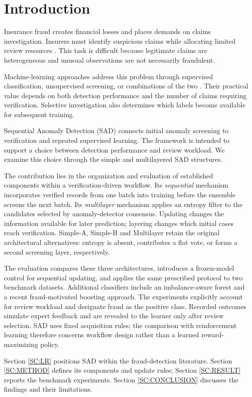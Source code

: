 \section{Introduction}\label{sec:introduction}
Insurance fraud creates financial losses and places demands on claims
investigation. Insurers must identify suspicious claims while allocating
limited review resources \citep{A61,Bolton2002}. This task is difficult
because legitimate claims are heterogeneous and unusual observations are
not necessarily fraudulent.

Machine-learning approaches address this problem through supervised
classification, unsupervised screening, or combinations of the two
\citep{Ngai2011,West2016,Schrijver2024}. Their practical value depends on
both detection performance and the number of claims requiring verification.
Selective investigation also determines which labels become available
for subsequent training.

Sequential Anomaly Detection (SAD) connects initial anomaly screening to
verification and repeated supervised learning. The framework is intended
to support a choice between detection performance and review workload.
We examine this choice through the simple and multilayered SAD structures.

\begin{revised}
The contribution lies in the organization and evaluation of established
components within a verification-driven workflow. Its \emph{sequential}
mechanism incorporates verified records from one batch into training before
the ensemble screens the next batch. Its \emph{multilayer} mechanism
applies an entropy filter to the candidates selected by anomaly-detector
consensus. Updating changes the information available for later prediction;
layering changes which initial cases reach verification. Simple-A,
Simple-B and Multilayer retain the original architectural alternatives:
entropy is absent, contributes a flat vote, or forms a second screening
layer, respectively.

The evaluation compares these three architectures, introduces a frozen-model
control for sequential updating, and applies the same prescribed protocol
to two benchmark datasets. Additional classifiers include an imbalance-aware
forest and a recent fraud-motivated boosting approach. The experiments
explicitly account for review workload and designate fraud as the positive
class. Recorded outcomes simulate expert feedback and are revealed to the
learner only after review selection. SAD uses fixed acquisition rules;
the comparison with reinforcement learning therefore concerns workflow
design rather than a learned reward-maximizing policy.
\end{revised}

Section \ref{SC:LR} positions SAD within the fraud-detection literature.
Section \ref{SC:METHOD} defines its components and update rules;
Section \ref{SC:RESULT} reports the benchmark experiments.
Section \ref{SC:CONCLUSION} discusses the findings and their limitations.
